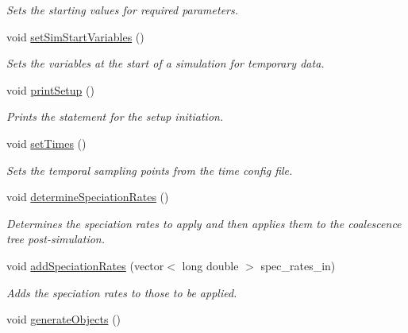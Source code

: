 \begin{DoxyCompactItemize}
\begin{DoxyCompactList}\small\item\em Sets the starting values for required parameters. \end{DoxyCompactList}\item 
void \hyperlink{class_tree_a1ba0f5d27c6ef6e9e17f988aff2dfe65}{set\+Sim\+Start\+Variables} ()
\begin{DoxyCompactList}\small\item\em Sets the variables at the start of a simulation for temporary data. \end{DoxyCompactList}\item 
void \hyperlink{class_tree_ab71da7797a6586ddd948661c34ce4788}{print\+Setup} ()
\begin{DoxyCompactList}\small\item\em Prints the statement for the setup initiation. \end{DoxyCompactList}\item 
void \hyperlink{class_tree_ae3fb33c46cf7e3af44604a9875b375a3}{set\+Times} ()\hypertarget{class_tree_ae3fb33c46cf7e3af44604a9875b375a3}{}\label{class_tree_ae3fb33c46cf7e3af44604a9875b375a3}

\begin{DoxyCompactList}\small\item\em Sets the temporal sampling points from the time config file. \end{DoxyCompactList}\item 
void \hyperlink{class_tree_a25f082da13789dfa3fefcbcfd08b4dfe}{determine\+Speciation\+Rates} ()
\begin{DoxyCompactList}\small\item\em Determines the speciation rates to apply and then applies them to the coalescence tree post-\/simulation. \end{DoxyCompactList}\item 
void \hyperlink{class_tree_a38488499b196d3f5ee40b2a68fe3279e}{add\+Speciation\+Rates} (vector$<$ long double $>$ spec\+\_\+rates\+\_\+in)\hypertarget{class_tree_a38488499b196d3f5ee40b2a68fe3279e}{}\label{class_tree_a38488499b196d3f5ee40b2a68fe3279e}

\begin{DoxyCompactList}\small\item\em Adds the speciation rates to those to be applied. \end{DoxyCompactList}\item 
void \hyperlink{class_tree_a50b3d13d4032e0d7a69890b9bd7f84fa}{generate\+Objects} ()\hypertarget{class_tree_a50b3d13d4032e0d7a69890b9bd7f84fa}{}\label{class_tree_a50b3d13d4032e0d7a69890b9bd7f84fa}


\end{DoxyCompactItemize}
